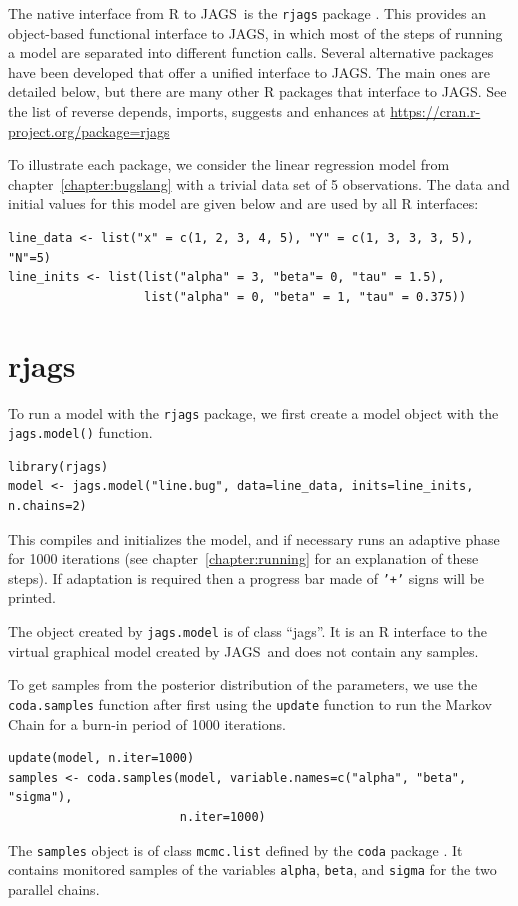 \documentclass[11pt, a4paper, titlepage]{report}
\newcommand{\JAGS}{\textsf{JAGS}}
\begin{document}
The native interface from R to \JAGS\ is the \texttt{rjags} package
\citep{Plummer2016}. This provides an object-based functional
interface to \JAGS, in which most of the steps of running a model are
separated into different function calls. Several alternative packages
have been developed that offer a unified interface to \JAGS. The
main ones are detailed below, but there are many other R packages that
interface to \JAGS. See the list of reverse depends, imports, suggests
and enhances at \url{https://cran.r-project.org/package=rjags}

To illustrate each package, we consider the linear regression
model from chapter~\ref{chapter:bugslang} with a trivial data set
of 5 observations. The data and initial values for this model
are given below and are used by all R interfaces:
\begin{verbatim}
line_data <- list("x" = c(1, 2, 3, 4, 5), "Y" = c(1, 3, 3, 3, 5), "N"=5)
line_inits <- list(list("alpha" = 3, "beta"= 0, "tau" = 1.5),
                   list("alpha" = 0, "beta" = 1, "tau" = 0.375))
\end{verbatim}

\section{rjags}
\label{section:rjags}

To run a model with the \texttt{rjags} package, we first create a model
object with the \texttt{jags.model()} function.
\begin{verbatim}
library(rjags)
model <- jags.model("line.bug", data=line_data, inits=line_inits, n.chains=2)
\end{verbatim}
This compiles and initializes the model, and if necessary runs an
adaptive phase for 1000 iterations (see chapter~\ref{chapter:running}
for an explanation of these steps). If adaptation is required then a
progress bar made of \texttt{'+'} signs will be printed.

The object created by \texttt{jags.model} is of class ``jags''. It is
an R interface to the virtual graphical model created by \JAGS\ and does
not contain any samples.

To get samples from the posterior distribution of the parameters, we
use the \texttt{coda.samples} function after first using the
\texttt{update} function to run the Markov Chain for a burn-in period
of 1000 iterations.
\begin{verbatim}
update(model, n.iter=1000) 
samples <- coda.samples(model, variable.names=c("alpha", "beta", "sigma"), 
                        n.iter=1000)
\end{verbatim}
The \texttt{samples} object is of class \texttt{mcmc.list} defined by
the \texttt{coda} package \citep{PlummerEtal2005}. It contains
monitored samples of the variables \texttt{alpha}, \texttt{beta}, and
\texttt{sigma} for the two parallel chains.
\end{document}
